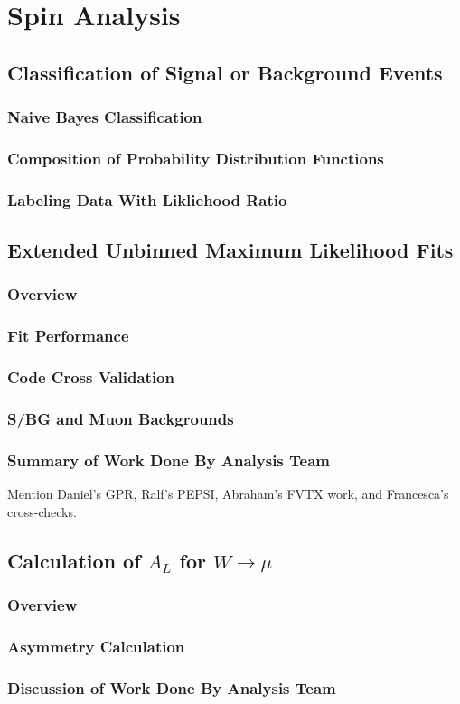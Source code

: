 \chapter{Spin Analysis}
\section{Classification of Signal or Background Events}
\subsection{Naive Bayes Classification}
\subsection{Composition of Probability Distribution Functions}
\subsection{Labeling Data With Likliehood Ratio}
\section{Extended Unbinned Maximum Likelihood Fits}
\subsection{Overview}
\subsection{Fit Performance}
\subsection{Code Cross Validation}
\subsection{S/BG and Muon Backgrounds}
\subsection{Summary of Work Done By Analysis Team}
Mention Daniel's GPR, Ralf's PEPSI, Abraham's FVTX work, and Francesca's cross-checks.
\section{Calculation of $A_{L}$ for $W\rightarrow\mu$}
\subsection{Overview}
\subsection{Asymmetry Calculation}
\subsection{Discussion of Work Done By Analysis Team}
